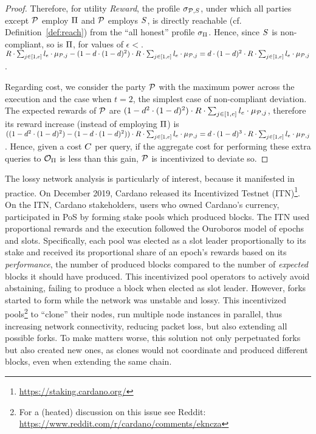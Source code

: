 \begin{proof}
    Therefore, for utility \emph{Reward}, the profile
    $\sigma_{\mathcal{P}, S}$, under which all parties except $\mathcal{P}$
    employ $\Pi$ and $\mathcal{P}$ employs $S$, is directly reachable
    (cf. Definition~\ref{def:reach}) from the ``all honest'' profile
    $\sigma_\Pi$. Hence, since $S$ is non-compliant, so is
    $\Pi$, for values of $\epsilon < $.
    $R \cdot \sum_{j \in [1, e]} l_e \cdot \mu_{\mathcal{P},j} - (1 - d \cdot (1 - d)^2) \cdot R \cdot \sum_{j \in [1, e]} l_e \cdot \mu_{\mathcal{P},j} = d \cdot (1 - d)^2 \cdot R \cdot \sum_{j \in [1, e]} l_e \cdot \mu_{\mathcal{P},j}$.

    Regarding cost, we consider the party $\mathcal{P}$ with the maximum power
    across the execution and the case when $t = 2$, \ie the simplest case of
    non-compliant deviation. The expected rewards of $\mathcal{P}$ are
    $(1 - d^2 \cdot (1 - d)^2) \cdot R \cdot \sum_{j \in [1, e]} l_e \cdot \mu_{\mathcal{P},j}$,
    therefore its reward increase (instead of employing $\Pi$) is
    $( (1 - d^2 \cdot (1 - d)^2) - (1 - d \cdot (1 - d)^2)) \cdot R \cdot \sum_{j \in [1, e]} l_e \cdot \mu_{\mathcal{P},j} =
    d \cdot (1 - d)^3 \cdot R \cdot \sum_{j \in [1, e]} l_e \cdot \mu_{\mathcal{P},j}$.
    Hence, given a cost $C$ per query, if the aggregate cost for performing
    these extra queries to $\mathcal{O}_\Pi$ is less than this gain, $\mathcal{P}$ is
    incentivized to deviate so.
\end{proof}

The lossy network analysis is particularly of interest, because it manifested
in practice. On December 2019, Cardano released its Incentivized Testnet
(ITN)\footnote{\url{https://staking.cardano.org/}}. On the ITN, Cardano
stakeholders, \ie users who owned Cardano's currency, participated in PoS by
forming stake pools which produced blocks. The ITN used proportional rewards
and the execution followed the Ouroboros model of epochs and slots.
Specifically, each pool was elected as a slot leader proportionally to its
stake and received its proportional share of an epoch's rewards based on its
\emph{performance}, \ie the number of produced blocks compared to the number of
\emph{expected} blocks it should have produced. This incentivized pool
operators to actively avoid abstaining, \ie failing to produce a block when
elected as slot leader. However, forks started to form while the network was
unstable and lossy. This incentivized pools\footnote{For a (heated) discussion
on this issue see Reddit:
\url{https://www.reddit.com/r/cardano/comments/ekncza}} to ``clone'' their
nodes, \ie run multiple node instances in parallel, thus increasing network
connectivity, reducing packet loss, but also extending all possible forks. To
make matters worse, this solution not only perpetuated forks but also created
new ones, as clones would not coordinate and produced different blocks, even
when extending the same chain.


